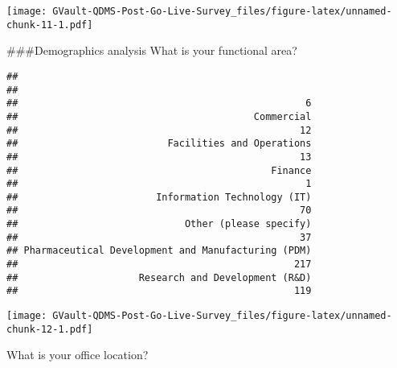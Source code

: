 \documentclass[
]{article}
\newenvironment{Shaded}{\begin{snugshade}}{\end{snugshade}}
\newcommand{\DataTypeTok}[1]{\textcolor[rgb]{0.13,0.29,0.53}{#1}}
\newcommand{\DecValTok}[1]{\textcolor[rgb]{0.00,0.00,0.81}{#1}}
\newcommand{\FloatTok}[1]{\textcolor[rgb]{0.00,0.00,0.81}{#1}}
\newcommand{\KeywordTok}[1]{\textcolor[rgb]{0.13,0.29,0.53}{\textbf{#1}}}
\newcommand{\NormalTok}[1]{#1}
\newcommand{\OperatorTok}[1]{\textcolor[rgb]{0.81,0.36,0.00}{\textbf{#1}}}
\newcommand{\StringTok}[1]{\textcolor[rgb]{0.31,0.60,0.02}{#1}}
\begin{document}
\texttt{[image: GVault-QDMS-Post-Go-Live-Survey\_files/figure-latex/unnamed-chunk-11-1.pdf]}

\#\#\#Demographics analysis What is your functional area?

\begin{Shaded}
\end{Shaded}

\begin{verbatim}
## 
##                                                    
##                                                  6 
##                                         Commercial 
##                                                 12 
##                          Facilities and Operations 
##                                                 13 
##                                            Finance 
##                                                  1 
##                        Information Technology (IT) 
##                                                 70 
##                             Other (please specify) 
##                                                 37 
## Pharmaceutical Development and Manufacturing (PDM) 
##                                                217 
##                     Research and Development (R&D) 
##                                                119
\end{verbatim}

\begin{Shaded}
\end{Shaded}

\texttt{[image: GVault-QDMS-Post-Go-Live-Survey\_files/figure-latex/unnamed-chunk-12-1.pdf]}

What is your office location?

\begin{Shaded}
\end{Shaded}
\end{document}
